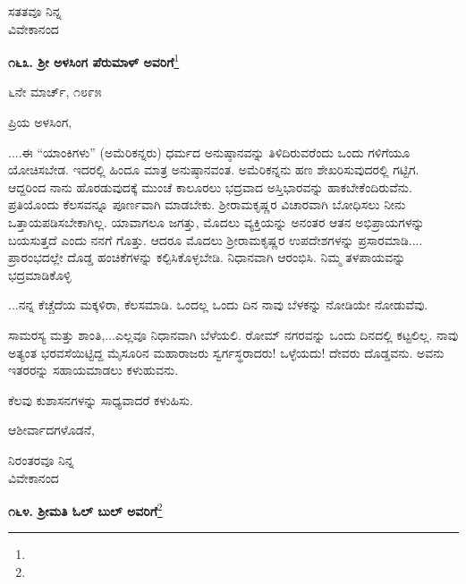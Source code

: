 \vspace{-0.5cm}

{\flushright
ಸತತವೂ ನಿನ್ನ\\ವಿವೇಕಾನಂದ\par}

\begin{center}
\textbf{೧೬೩. ಶ‍್ರೀ ಅಳಸಿಂಗ ಪೆರುಮಾಳ್ ಅವರಿಗೆ}\footnote{}
\end{center}

\vspace{-0.5cm}

\begin{flushright}
೬ನೇ ಮಾರ್ಚ್, ೧೮೯೫
\end{flushright}

\vspace{-0.5cm}

\noindent
ಪ್ರಿಯ ಅಳಸಿಂಗ,

....ಈ “ಯಾಂಕಿಗಳು” (ಅಮೆರಿಕನ್ನರು) ಧರ್ಮದ ಅನುಷ್ಠಾನವನ್ನು ತಿಳಿದಿರುವರೆಂದು ಒಂದು ಗಳಿಗೆಯೂ ಯೋಚಿಸಬೇಡ. ಇದರಲ್ಲಿ ಹಿಂದೂ ಮಾತ್ರ ಅನುಷ್ಠಾನವಂತ. ಅಮೆರಿಕನ್ನನು ಹಣ ಶೇಖರಿಸುವುದರಲ್ಲಿ ಗಟ್ಟಿಗ. ಆದ್ದರಿಂದ ನಾನು ಹೊರಡುವುದಕ್ಕೆ ಮುಂಚೆ ಕಾಲೂರಲು ಭದ್ರವಾದ ಅಸ್ತಿಭಾರವನ್ನು ಹಾಕಬೇಕೆಂದಿರುವೆನು. ಪ್ರತಿಯೊಂದು ಕೆಲಸವನ್ನೂ ಪೂರ್ಣವಾಗಿ ಮಾಡಬೇಕು. ಶ‍್ರೀರಾಮಕೃಷ್ಣರ ವಿಚಾರವಾಗಿ ಬೋಧಿಸಲು ನೀನು ಒತ್ತಾಯಪಡಿಸಬೇಕಾಗಿಲ್ಲ. ಯಾವಾಗಲೂ ಜಗತ್ತು, ಮೊದಲು ವ್ಯಕ್ತಿಯನ್ನು ಅನಂತರ ಆತನ ಅಭಿಪ್ರಾಯಗಳನ್ನು ಬಯಸುತ್ತದೆ ಎಂದು ನನಗೆ ಗೊತ್ತು. ಆದರೂ ಮೊದಲು ಶ‍್ರೀರಾಮಕೃಷ್ಣರ ಉಪದೇಶಗಳನ್ನು ಪ್ರಸಾರಮಾಡಿ.... ಪ್ರಾರಂಭದಲ್ಲೇ ದೊಡ್ಡ ಹಂಚಿಕೆಗಳನ್ನು ಕಲ್ಪಿಸಿಕೊಳ್ಳಬೇಡಿ. ನಿಧಾನವಾಗಿ ಆರಂಭಿಸಿ. ನಿಮ್ಮ ತಳಪಾಯವನ್ನು ಭದ್ರಮಾಡಿಕೊಳ್ಳಿ

...ನನ್ನ ಕೆಚ್ಚೆದೆಯ ಮಕ್ಕಳಿರಾ, ಕೆಲಸಮಾಡಿ. ಒಂದಲ್ಲ ಒಂದು ದಿನ ನಾವು ಬೆಳಕನ್ನು ನೋಡಿಯೇ ನೋಡುವೆವು.

ಸಾಮರಸ್ಯ ಮತ್ತು ಶಾಂತಿ,...ಎಲ್ಲವೂ ನಿಧಾನವಾಗಿ ಬೆಳೆಯಲಿ. ರೋಮ್ ನಗರವನ್ನು ಒಂದು ದಿನದಲ್ಲಿ ಕಟ್ಟಲಿಲ್ಲ. ನಾವು ಅತ್ಯಂತ ಭರವಸೆಯಿಟ್ಟಿದ್ದ ಮೈಸೂರಿನ ಮಹಾರಾಜರು ಸ್ವರ್ಗಸ್ಥರಾದರು! ಒಳ್ಳೆಯದು! ದೇವರು ದೊಡ್ಡವನು. ಅವನು ಇತರರನ್ನು ಸಹಾಯಮಾಡಲು ಕಳುಹುವನು.

ಕೆಲವು ಕುಶಾಸನಗಳನ್ನು ಸಾಧ್ಯವಾದರೆ ಕಳುಹಿಸು.

ಆಶೀರ್ವಾದಗಳೊಡನೆ,

\vspace{-0.5cm}

{\flushright
ನಿರಂತರವೂ ನಿನ್ನ\\ವಿವೇಕಾನಂದ\par}

\begin{center}
\textbf{೧೬೪. ಶ‍್ರೀಮತಿ ಓಲ್ ಬುಲ್ ಅವರಿಗೆ}\footnote{}
\end{center}

\vspace{-0.5cm}

